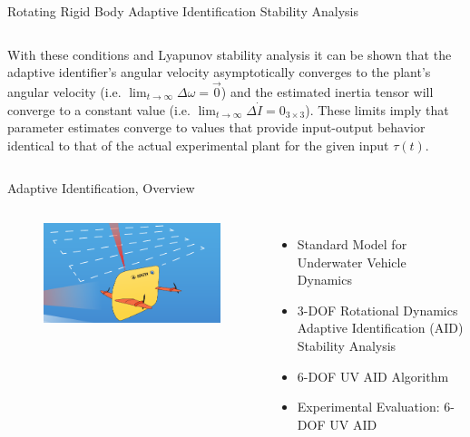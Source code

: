 \begin{frame}{Rotating Rigid Body Adaptive Identification Stability Analysis}
\begin{columns}
{      With these conditions and Lyapunov stability analysis it can be
      shown that the adaptive identifier's angular velocity
      asymptotically converges to the plant's angular velocity
      (i.e. $\lim_{t\to \infty}\Delta \omega=\vec{0}$) and the
      estimated inertia tensor will converge to a constant value
      (i.e. $\lim_{t\to \infty}\Delta \dot{I}=0_{3\times3}$). These
      limits imply that \alert<5->{parameter estimates converge to
        values that provide input-output behavior identical to that of
        the actual experimental plant for the given input $\tau(t)$.}

    }
  \end{columns}
\end{frame}

\begin{frame}[t]{Adaptive Identification, Overview}%

   \begin{columns}
      \begin{figure}[t!]
        \begin{center}
          \includegraphics[width=\textwidth]{./pres/images/justSentry}
        \end{center}
      \end{figure}

   \begin{itemize}
\item<1>Standard Model for Underwater Vehicle Dynamics
\item<1> 3-DOF Rotational Dynamics Adaptive Identification (AID) Stability Analysis
\item<1-2>    \alert<2>{6-DOF UV AID Algorithm} 
\item<1,3> \alert<3>{Experimental Evaluation: 6-DOF UV AID}
   \end{itemize}
\end{columns}
\end{frame}


